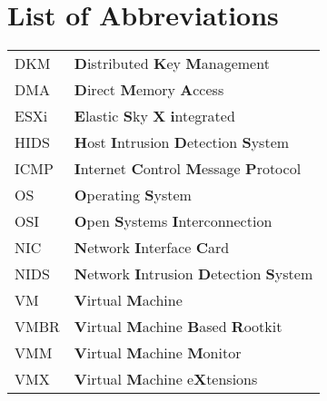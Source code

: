 \chapter{List of Abbreviations}
\begin{flushleft}
\renewcommand{\baselinestretch}{1.5}
\small\normalsize
\begin{longtable}{ll}
	DKM & \textbf{D}istributed \textbf{K}ey \textbf{M}anagement \\
	DMA & \textbf{D}irect \textbf{M}emory \textbf{A}ccess \\
	ESXi & \textbf{E}lastic \textbf{S}ky \textbf{X} \textbf{i}ntegrated \\
	HIDS & \textbf{H}ost \textbf{I}ntrusion \textbf{D}etection \textbf{S}ystem \\
	ICMP & \textbf{I}nternet \textbf{C}ontrol \textbf{M}essage \textbf{P}rotocol \\
	OS & \textbf{O}perating \textbf{S}ystem \\
	OSI & \textbf{O}pen \textbf{S}ystems \textbf{I}nterconnection\\
	NIC & \textbf{N}etwork \textbf{I}nterface \textbf{C}ard \\
	NIDS & \textbf{N}etwork \textbf{I}ntrusion \textbf{D}etection \textbf{S}ystem \\
	VM & \textbf{V}irtual \textbf{M}achine \\
	VMBR	& \textbf{V}irtual \textbf{M}achine \textbf{B}ased \textbf{R}ootkit \\
	VMM & \textbf{V}irtual \textbf{M}achine \textbf{M}onitor \\
	VMX & \textbf{V}irtual \textbf{M}achine e\textbf{X}tensions \\
\end{longtable}
\end{flushleft}